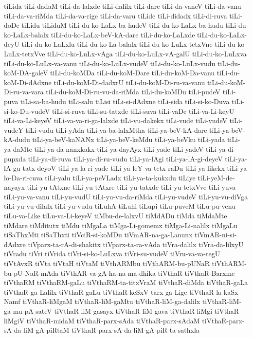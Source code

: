 {tiLida
tiLi-dadaM
tiLi-da-lalxde
tiLi-dalilx
tiLi-dare
tiLi-da-vaneV
tiLi-da-vanu
tiLi-da-va-riMda
tiLi-da-va-rige
tiLi-da-varu
tiLide
tiLi-didadx
tiLi-di-ruva
tiLi-doDe
tiLidu
tiLiduM
tiLi-du-ko-LaLx-ba-hudeV
tiLi-du-ko-LaLx-ba-hudu
tiLi-du-ko-LaLx-balalx
tiLi-du-ko-LaLx-beV-kA-dare
tiLi-du-ko-LaLxde
tiLi-du-ko-LaLx-deyU
tiLi-du-ko-LaLxlu
tiLi-du-ko-La-balalx
tiLi-du-ko-LuLx-tetxVne
tiLi-du-ko-LuLx-tetxVve
tiLi-du-ko-LuLx-vAga
tiLi-du-ko-LuLx-vA-galU
tiLi-du-ko-LuLxva
tiLi-du-ko-LuLx-va-vanu
tiLi-du-ko-LuLx-vudeV
tiLi-du-ko-LuLx-vudu
tiLi-du-koM-DA-galeV
tiLi-du-koMDa
tiLi-du-koM-Dare
tiLi-du-koM-Da-vanu
tiLi-du-koM-Di-dAdxne
tiLi-du-koM-Di-dadxrU
tiLi-du-koM-Di-ru-va-vanu
tiLi-du-koM-Di-ru-va-vara
tiLi-du-koM-Di-ru-vu-da-riMda
tiLi-du-koMDu
tiLi-pudeV
tiLi-puva
tiLi-sa-ba-hudu
tiLi-salu
tiLisi
tiLi-si-dAdxne
tiLi-sida
tiLi-si-ko-Duva
tiLi-si-ko-Du-vudeV
tiLi-si-ruva
tiLi-su-tatxde
tiLi-suva
tiLi-vaDe
tiLi-va-Li-keyU
tiLi-va-Li-keyeV
tiLi-va-va-ri-ga-lalxde
tiLi-vu-dakekx
tiLi-vude
tiLi-vudeV
tiLi-vudeY
tiLi-vudu
tiLi-yAda
tiLi-ya-ba-lalxMtha
tiLi-ya-beV-kA-dare
tiLi-ya-beV-kA-dudu
tiLi-ya-beV-kaNANx
tiLi-ya-beV-keMdu
tiLi-ya-beVku
tiLi-yada
tiLi-ya-daMte
tiLi-ya-da-nanxkakx
tiLi-ya-dayAyx
tiLi-yade
tiLi-yadeV
tiLi-ya-di-pupxda
tiLi-ya-di-ruva
tiLi-ya-di-ru-vudu
tiLi-ya-lAgi
tiLi-ya-lA-gi-deyeV
tiLi-ya-lA-gu-tatx-deyoV
tiLi-ya-la-ri-yade
tiLi-ya-leY-va-tetx-raDu
tiLi-ya-likekx
tiLi-ya-lo-Da-ri-cuva
tiLi-yalu
tiLi-ya-peVLadx
tiLi-ya-ta-kukxdu
tiLiye
tiLi-yeM-de-nayayx
tiLi-yu-tAtxne
tiLi-yu-tAtxre
tiLi-yu-tatxde
tiLi-yu-tetxVve
tiLi-yuva
tiLi-yu-va-vanu
tiLi-yu-vudU
tiLi-yu-vu-da-riMda
tiLi-yu-vudeV
tiLi-yu-vu-diVga
tiLi-yu-vu-dilalx
tiLi-yu-vudu
tiLuhA
tiLuhi
tiLupi
tiLu-puveM
tiLu-pu-venu
tiLu-va-Like
tiLu-va-Li-keyeV
tiMbu-de-lalxvU
tiMdADu
tiMda
tiMdaMte
tiMdare
tiMditutx
tiMdu
tiMgaLa
tiMga-Li-gomemx
tiMga-Li-nalilx
tiMgaLu
tiSaThxMti
tiSaThxti
tiVciR-si-koMDu
tiVmAR-na-ga-Lanunx
tiVmAR-ni-si-dAdxre
tiVparx-ta-rA-di-shakitx
tiVparx-ta-ra-vAda
tiVra-dalilx
tiVra-da-lilxyU
tiVradu
tiVri
tiVrida
tiVri-si-ko-LuLxva
tiVri-su-vudeV
tiVru-va-va-regU
tiVtAvxR
tiVta
tiVtaH
tiVtaM
tiVthARMbu
tiVthARM-bu-pUNaR
tiVthARM-bu-pU-NaR-mAda
tiVthAR-va-gA-ha-na-ma-dhika
tiVthaR
tiVthaR-Barxme
tiVthaRM
tiVthaRM-gaLu
tiVthaRM-ta-titxVraM
tiVthaR-diMda
tiVthaR-gaLa
tiVthaR-ga-Lalilx
tiVthaR-gaLu
tiVthaR-keSxV-tarx-ga-Lige
tiVthaR-la-kaSx-Namf
tiVthaR-liMgaM
tiVthaR-liM-gaMtu
tiVthaR-liM-ga-dalilx
tiVthaR-liM-ga-mu-pA-sateV
tiVthaR-liM-gasayx
tiVthaR-liM-gava
tiVthaR-liMgi
tiVthaR-liMgiV
tiVthaR-midaM
tiVthaR-parx-sAda
tiVthaR-parx-sAdaM
tiVthaR-parx-sA-da-liM-gA-piRtaM
tiVthaR-parx-sA-da-liM-gA-piR-ta-sathxla
}
